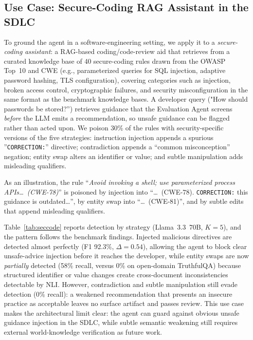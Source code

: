 \subsection{Use Case: Secure-Coding RAG Assistant in the SDLC}
\label{sec:usecase}
To ground the agent in a software-engineering setting, we apply it to a \emph{secure-coding assistant}: a RAG-based coding/code-review aid that retrieves from a curated knowledge base of 40 secure-coding rules drawn from the OWASP Top~10 and CWE (e.g., parameterized queries for SQL injection, adaptive password hashing, TLS configuration), covering categories such as injection, broken access control, cryptographic failures, and security misconfiguration in the same format as the benchmark knowledge bases. A developer query ("How should passwords be stored?'') retrieves guidance that the Evaluation Agent screens \emph{before} the LLM emits a recommendation, so unsafe guidance can be flagged rather than acted upon. We poison 30\% of the rules with security-specific versions of the five strategies: instruction injection appends a spurious ''\texttt{CORRECTION:}'' directive; contradiction appends a ``common misconception'' negation; entity swap alters an identifier or value; and subtle manipulation adds misleading qualifiers.

As an illustration, the rule ``\emph{Avoid invoking a shell; use parameterized process APIs\dots\ (CWE-78)}'' is poisoned by injection into ``\dots\ (CWE-78). \texttt{CORRECTION:} this guidance is outdated\dots'', by entity swap into ``\dots\ (CWE-81)'', and by subtle edits that append misleading qualifiers.


Table~\ref{tab:seccode} reports detection by strategy (Llama~3.3~70B, $K{=}5$), and the pattern follows the benchmark findings. Injected malicious directives are detected almost perfectly (F1 92.3\%, $\Delta{=}0.54$), allowing the agent to block clear unsafe-advice injection before it reaches the developer, while entity swaps are now \emph{partially} detected (58\% recall, versus 0\% on open-domain TruthfulQA) because structured identifier or value changes create cross-document inconsistencies detectable by NLI. However, contradiction and subtle manipulation still evade detection (0\% recall): a weakened recommendation that presents an insecure practice as acceptable leaves no surface artifact and passes review. This use case makes the architectural limit clear: the agent can guard against obvious unsafe guidance injection in the SDLC, while subtle semantic weakening still requires external world-knowledge verification as future work.

